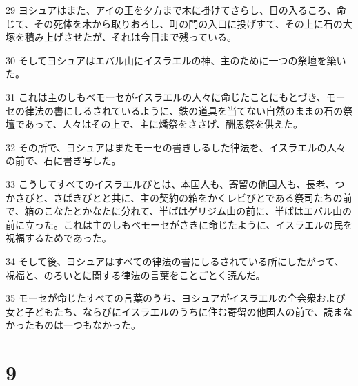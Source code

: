 \par 29 ヨシュアはまた、アイの王を夕方まで木に掛けてさらし、日の入るころ、命じて、その死体を木から取りおろし、町の門の入口に投げすて、その上に石の大塚を積み上げさせたが、それは今日まで残っている。
\par 30 そしてヨシュアはエバル山にイスラエルの神、主のために一つの祭壇を築いた。
\par 31 これは主のしもべモーセがイスラエルの人々に命じたことにもとづき、モーセの律法の書にしるされているように、鉄の道具を当てない自然のままの石の祭壇であって、人々はその上で、主に燔祭をささげ、酬恩祭を供えた。
\par 32 その所で、ヨシュアはまたモーセの書きしるした律法を、イスラエルの人々の前で、石に書き写した。
\par 33 こうしてすべてのイスラエルびとは、本国人も、寄留の他国人も、長老、つかさびと、さばきびとと共に、主の契約の箱をかくレビびとである祭司たちの前で、箱のこなたとかなたに分れて、半ばはゲリジム山の前に、半ばはエバル山の前に立った。これは主のしもべモーセがさきに命じたように、イスラエルの民を祝福するためであった。
\par 34 そして後、ヨシュアはすべての律法の書にしるされている所にしたがって、祝福と、のろいとに関する律法の言葉をことごとく読んだ。
\par 35 モーセが命じたすべての言葉のうち、ヨシュアがイスラエルの全会衆および女と子どもたち、ならびにイスラエルのうちに住む寄留の他国人の前で、読まなかったものは一つもなかった。

\chapter{9}

